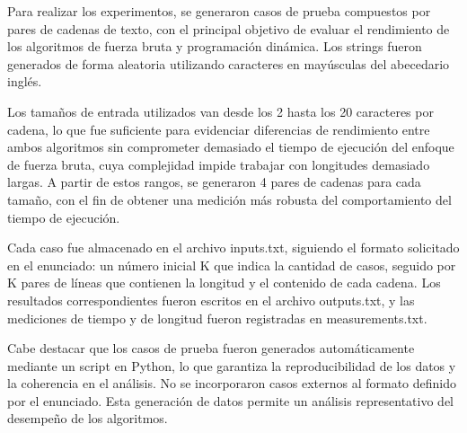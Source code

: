 Para realizar los experimentos, se generaron casos de prueba compuestos por pares de cadenas de texto, con el principal objetivo de evaluar el rendimiento de los algoritmos de fuerza bruta y programación dinámica. Los strings fueron generados de forma aleatoria utilizando caracteres en mayúsculas del abecedario inglés.

\vspace{0.5 cm}

Los tamaños de entrada utilizados van desde los 2 hasta los 20 caracteres por cadena, lo que fue suficiente para evidenciar diferencias de rendimiento entre ambos algoritmos sin comprometer demasiado el tiempo de ejecución del enfoque de fuerza bruta, cuya complejidad impide trabajar con longitudes demasiado largas. A partir de estos rangos, se generaron 4 pares de cadenas para cada tamaño, con el fin de obtener una medición más robusta del comportamiento del tiempo de ejecución.

\vspace{0.5 cm}

Cada caso fue almacenado en el archivo inputs.txt, siguiendo el formato solicitado en el enunciado: un número inicial K que indica la cantidad de casos, seguido por K pares de líneas que contienen la longitud y el contenido de cada cadena. Los resultados correspondientes fueron escritos en el archivo outputs.txt, y las mediciones de tiempo y de longitud fueron registradas en measurements.txt.

\vspace{0.5 cm}

Cabe destacar que los casos de prueba fueron generados automáticamente mediante un script en Python, lo que garantiza la reproducibilidad de los datos y la coherencia en el análisis. No se incorporaron casos externos al formato definido por el enunciado. Esta generación de datos permite un análisis representativo del desempeño de los algoritmos.